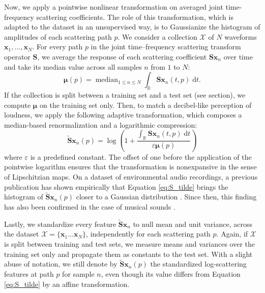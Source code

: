 \documentclass{bmcart}
\DeclareMathOperator*{\median}{median}
\newcommand{\lnameref}[1]{%
\bgroup
\let\nmu\MakeLowercase
\nameref{#1}\egroup}
\newcommand{\nmu}{}
\begin{document}
Now, we apply a pointwise nonlinear transformation on averaged joint time-frequency scattering coefficients.
The role of this transformation, which is adapted to the dataset in an unsupervised way, is to Gaussianize the histogram of amplitudes of each scattering path $p$.
We consider a collection $\mathcal{X}$ of $N$ waveforms $\boldsymbol{x}_1,\ldots,\boldsymbol{x}_N$. For every path $p$ in the joint time--frequency scattering transform operator $\mathbf{S}$, we average the response of each scattering coefficient $\mathbf{S}\boldsymbol{x}_n$ over time and take its median value across all samples $n$ from $1$ to $N$:
\begin{equation}
\boldsymbol{\mu}(p) =
\median_{1\leq n \leq N}
\int_{\mathbb{R}} \mathbf{S}\boldsymbol{x}_n(t, p) \;\mathrm{d}t.
\end{equation}
If the collection is split between a training set and a test set (see \lnameref{sec:discussion} section), we compute $\boldsymbol{\mu}$ on the training set only.
Then, to match a decibel-like perception of loudness, we apply the following adaptive transformation, which composes a median-based renormalization and a logarithmic compression:
\begin{equation}
\mathbf{\widetilde{S}}\boldsymbol{x}_n (p) =
\log \left(
1 +
\dfrac{
\int_\mathbb{R} \mathbf{S}\boldsymbol{x}_n (t, p) \;\mathrm{d}t
}{\varepsilon\boldsymbol{\mu}(p)}
\right)
\label{eq:S_tilde}
\end{equation}
where $\varepsilon$ is a predefined constant.
The offset of one before the application of the pointwise logarithm ensures that the transformation is nonexpansive in the sense of Lipschitzian maps.
On a dataset of environmental audio recordings, a previous publication has shown empirically that Equation \ref{eq:S_tilde} brings the histogram of $\mathbf{\widetilde{S}}\boldsymbol{x}_n (p)$ closer to a Gaussian distribution \cite{lostanlen2018jasmp}.
Since then, this finding has also been confirmed in the case of musical sounds \cite{lostanlen2018extended}.

Lastly, we standardize every feature $\mathbf{\widetilde{S}}\boldsymbol{x}_n$ to null mean and unit variance, across the dataset $\mathcal{X} = \{\boldsymbol{x}_1 \ldots \boldsymbol{x}_N\}$, independently for each scattering path $p$.
Again, if $\mathcal{X}$ is split between training and test sets, we measure means and variances over the training set only and propagate them as constants to the test set.
With a slight abuse of notation, we still denote by $\mathbf{\widetilde{S}}\boldsymbol{x}_n (p)$ the standardized log-scattering features at path $p$ for sample $n$, even though its value differs from Equation \ref{eq:S_tilde} by an affine transformation.
\end{document}
